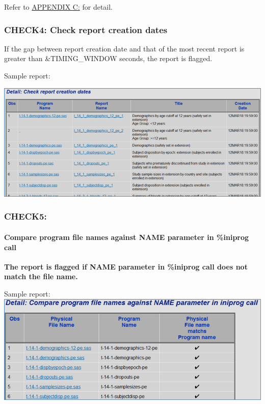 \documentclass[
  letterpaper,
  DIV=11,
  numbers=noendperiod]{scrartcl}
\let\oldparagraph\paragraph
\renewcommand{\paragraph}[1]{\oldparagraph{#1}\mbox{}}
\begin{document}
Refer to \protect\hyperlink{appendix-c}{APPENDIX C:} for detail.

\hypertarget{check4-check-report-creation-dates}{%
\subsubsection{CHECK4: Check report creation
dates}\label{check4-check-report-creation-dates}}

If the gap between report creation date and that of the most recent
report is greater than \&TIMING\_WINDOW seconds, the report is flagged.

Sample report:

\includegraphics{image/Picture5.png}

\hypertarget{check5}{%
\subsubsection{CHECK5:}\label{check5}}

\hypertarget{compare-program-file-names-against-name-parameter-in-iniprog-call}{%
\paragraph{Compare program file names against NAME parameter in
\%iniprog
call}\label{compare-program-file-names-against-name-parameter-in-iniprog-call}}

\textbf{The report is flagged if NAME parameter in \%iniprog call does
not match the file name.}

Sample report:\\
\includegraphics{image/Picture6.png}
\end{document}
